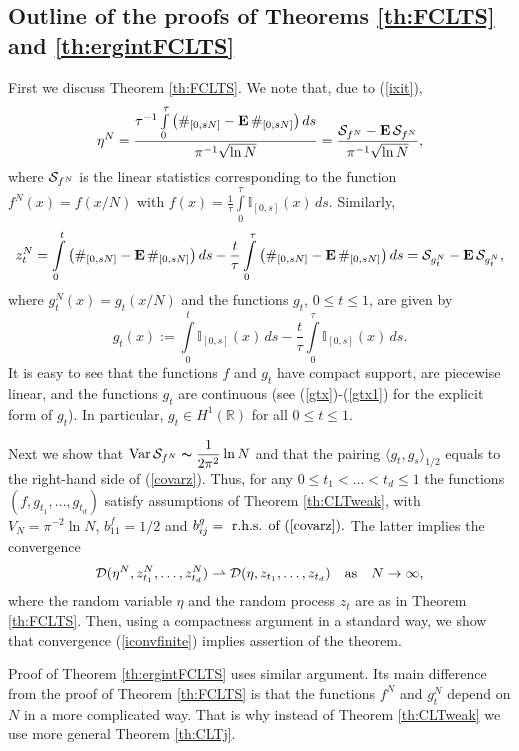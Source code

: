 \documentclass{article}
\numberwithin{equation}{section}
\newcommand{\mR}{\mathbb{R}}
\newcommand{\mI}{\mathbb{I}}
\newcommand{\DD}{{\cal D}}
\newcommand{\SSS}{{\cal S}}
\newcommand{\Var}{\operatorname{Var}}
\newcommand{\MO}{\mbox{\bf E}\,}
\newcommand{\ds}{\displaystyle{}}
\newcommand{\ra}{\rightarrow}
\newcommand{\ran}{\rangle}
\newcommand{\lan}{\langle}
\newcommand{\volna}{\thicksim}
\newcommand{\raw}{\rightharpoonup}
\newcommand{\fr}{\frac}
\newcommand{\ili}{\int\limits}
\newcommand{\lbl}{\label}
\newcommand{\ass}{\quad\mbox{as}\quad}
\newcommand{\rtheo}{Theorem \nolinebreak}
\newcommand{\bee}{\begin{equation}}
\newcommand{\eee}{\end{equation}}
\newcommand{\sq}{\sqrt}
\begin{document}
\subsection{Outline of the proofs of Theorems \ref{th:FCLTS} and \ref{th:ergintFCLTS} }
\lbl{sec:sketch}

First we discuss \rtheo \ref{th:FCLTS}. We note that, due to (\ref{ixit}),
$$
\eta^N=\fr{\tau^{-1}\ili_0^{\tau} \big(\#_{[0,sN]} -\MO \#_{[0,sN]}\big) \,ds}{\pi^{-1}\sq{\ln N}}
=\fr{\SSS_{f^N}-\MO \SSS_{f^N}}{\pi^{-1}\sqrt{ \ln N}},
$$
where $\SSS_{f^N}$ is the linear statistics corresponding to the function
$f^N(x)=f(x/N)$ with
$f(x)=\fr{1}{\tau}\ili_0^{\tau} \mI_{[0,s]}(x)\,ds$.
Similarly,
$$
z_t^N
=\ili_0^t \big(\#_{[0,sN]} -\MO \#_{[0,sN]}\big) \,ds
- \fr{t}{\tau} \ili_0^{\tau} \big(\#_{[0,sN]} - \MO \#_{[0,sN]}\big) \, ds
=\SSS_{g^N_t}-\MO \SSS_{g^N_t},
$$
where $g^N_t(x)=g_t(x/N)$ and
the functions $g_t$, $0\leq t\leq 1$,
are given by
\bee\lbl{igtN}
g_t(x):=\ili_0^t \mI_{[0,s]}(x)\, ds - \fr{t}{\tau}\ili_0^{\tau} \mI_{[0,s]}(x)\, ds.
\eee
It is easy to see that the functions $f$ and $g_t$ have compact support, are piecewise linear,
and the functions $g_t$ are continuous (see (\ref{gtx})-(\ref{gtx1}) for the explicit form of $g_t$).
In particular, $g_t\in H^1(\mR)$ for all $0\leq t\leq 1$.

Next we show that
$\ds{\Var\SSS_{f^N}\volna \fr{1}{2\pi^{2}} \ln N}$
and that the pairing
$\lan g_t,g_s\ran_{1/2}$
equals to the right-hand side of (\ref{covarz}).
Thus,
for any
$0\leq t_1<\ldots< t_d\leq 1$
the functions
$(f, g_{t_1},\ldots, g_{t_d})$
satisfy assumptions of \rtheo\ref{th:CLTweak},
with $V_N=\pi^{-2} \ln N$, $b^f_{11}=1/2$
and
$
b^g_{ij}=\mbox{ r.h.s. of (\ref{covarz})}.
$
The latter implies the convergence
\bee\lbl{iconvfinite}
\DD(\eta^N,z^N_{t_1},\ldots,z^N_{t_d})
\raw
\DD(\eta,z_{t_1},\ldots,z_{t_d})
\ass N\ra\infty,
\eee
where the random variable $\eta$ and the random process $z_t$
are as in \rtheo \ref{th:FCLTS}.
Then, using a compactness argument in a standard way,
we show that convergence (\ref{iconvfinite})
implies assertion of the theorem.

Proof of \rtheo \ref{th:ergintFCLTS} uses similar argument. 
Its main difference from the proof of \rtheo\ref{th:FCLTS} is that the functions $f^N$ and $g_t^N$ depend on $N$ in a more complicated way. 
That is why instead of \rtheo\ref{th:CLTweak} 
we use more general 
\rtheo\ref{th:CLTj}.
\end{document}
